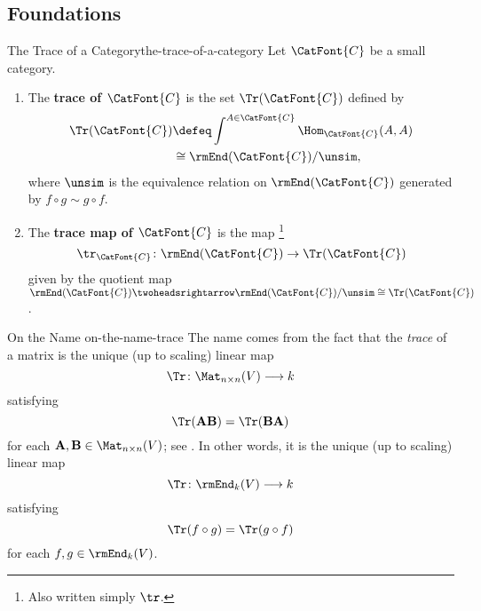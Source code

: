 \subsection{Foundations}\label{subsection-the-trace-of-a-category-foundations}
\begin{definition}{The Trace of a Category}{the-trace-of-a-category}%
    Let $\CatFont{C}$ be a small category.
    \begin{enumerate}
        \item\label{the-trace-of-a-category-the-trace-of-a-category}The \textbf{trace of $\CatFont{C}$} is the set $\Tr(\CatFont{C})$ defined by%
            \begin{align*}%
                \Tr(\CatFont{C}) &\defeq \int^{A\in\CatFont{C}}\Hom_{\CatFont{C}}(A,A)\\%
                                 &\cong  \rmEnd(\CatFont{C})/\unsim,%
            \end{align*}%
            where $\unsim$ is the equivalence relation on $\rmEnd(\CatFont{C})$ generated by $f\circ g\sim g\circ f$.%
        \item\label{the-trace-of-a-category-the-trace-map}The \textbf{trace map of $\CatFont{C}$} is the map%
            \footnote{%
                Also written simply $\tr$.
                \par\vspace*{-1.75\baselineskip}
            }%
            \[
                \tr_{\CatFont{C}}%
                \colon%
                \rmEnd(\CatFont{C})%
                \to%
                \Tr(\CatFont{C})%
            \]%
            given by the quotient map $\rmEnd(\CatFont{C})\twoheadsrightarrow\rmEnd(\CatFont{C})/\unsim\cong\Tr(\CatFont{C})$.
    \end{enumerate}
\end{definition}
\begin{remark}{On the Name }{on-the-name-trace}%
    The name  comes from the fact that the \emph{trace} of a matrix is the unique (up to scaling) linear map
    \[
        \Tr
        \colon
        \Mat_{n\times n}(V)
        \longrightarrow
        k
    \]%
    satisfying
    \[
        \Tr(\mathbf{A}\mathbf{B})%
        =%
        \Tr(\mathbf{B}\mathbf{A})%
    \]%
    for each $\mathbf{A},\mathbf{B}\in\Mat_{n\times n}(V)$; see \cite[Exercise 2]{trace-as-an-alternative-decategorification-functor}. In other words, it is the unique (up to scaling) linear map
    \[
        \Tr
        \colon
        \rmEnd_{k}(V)
        \longrightarrow
        k
    \]%
    satisfying
    \[
        \Tr(f\circ g)
        =
        \Tr(g\circ f)
    \]%
    for each $f,g\in\rmEnd_{k}(V)$.
\end{remark}
